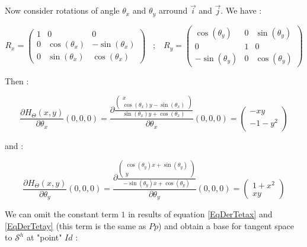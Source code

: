 Now consider  rotations of angle $\theta_x$ and $\theta_y$ arround $\vec{i}$ and $\vec{j}$. We have :

\begin{equation}
	R_x = \begin{pmatrix}  1 & 0 & 0 \\ 0 & \cos(\theta_x) & - \sin(\theta_x) \\ 0 & \sin(\theta_x) &  \cos(\theta_x) \end{pmatrix}
\;\;\;  ; \;\;\;  
	R_y = \begin{pmatrix}  \cos(\theta_y) & 0 &  \sin(\theta_y) \\ 0 & 1 & 0 \\  -\sin(\theta_y) & 0 &  \cos(\theta_y) \end{pmatrix}
\end{equation}

Then :

\begin{equation}
	\frac{\partial H_\Theta(x,y)}{\partial \theta_x} (0,0,0) 
		= \frac{\partial \frac{\begin{pmatrix} x \\  \cos(\theta_x) y-  \sin(\theta_x)  \end{pmatrix}}
			{\sin(\theta_x) y+\cos(\theta_x)}}{\partial \theta_x} (0,0,0)
		=  \begin{pmatrix} -xy \\ -1 -y^2 \end{pmatrix} 
      \label{EqDerTetax}
\end{equation}

and :

\begin{equation}
	\frac{\partial H_\Theta(x,y)}{\partial \theta_y} (0,0,0) 
		= \frac{\partial \frac{\begin{pmatrix}   \cos(\theta_y) x+  \sin(\theta_y)  \\ y \end{pmatrix}}
			{-\sin(\theta_y) x+\cos(\theta_y)}}{\partial \theta_y} (0,0,0)
		=  \begin{pmatrix} 1+x^2 \\ xy  \end{pmatrix} 
      \label{EqDerTetay}
\end{equation}

We can omit the constant term $1$ in results of equation \ref{EqDerTetax} and  \ref{EqDerTetay} (this
term is the same as $Pp$)  and obtain a base
for tangent space to  $\mathcal{S}^h$  at "point"  $Id$ :


